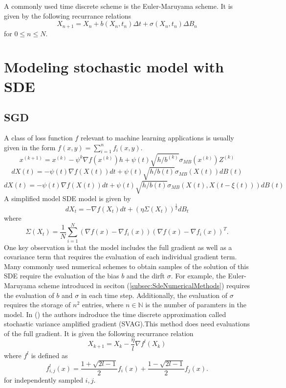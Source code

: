 \documentclass[12pt]{article}
\theoremstyle{definition}
\numberwithin{equation}{section}
\begin{document}
A commonly used time discrete scheme is the Euler-Maruyama scheme. It is given by the following recurrance relations
\begin{equation}
  X_{n+1} = X_n + b(X_n, t_n)\Delta t + \sigma(X_n, t_n) \Delta B_n
\end{equation}
for $0 \leq n \leq N$.
\section{Modeling stochastic model with SDE}

\subsection{SGD}
A class of loss function $f$ relevant to machine learning applications is usually given in the form $f(x,y) = \sum_{i=1}^n f_i(x,y)$.
\begin{equation}
  x^{(k+1)} = x^{(k)} - \psi^k \nabla f(x^{(k)}) h +  \psi(t)\sqrt{h/b^{(k)}} \sigma_{MB}(x^{(k)})Z^{(k)}
\end{equation}
\begin{equation}
  dX(t) = -\psi(t)\nabla f(X(t))dt + \psi(t)\sqrt{h/b(t)} \sigma_{MB}(X(t))dB(t)
\end{equation}
\begin{equation}
  dX(t) = -\psi(t)\nabla f(X(t))dt + \psi(t)\sqrt{h/b(t)} \sigma_{MB}(X(t), X(t-\xi(t)))dB(t)
\end{equation}
A simplified model SDE model is given by 
\begin{equation}
  dX_t = -\nabla f(X_t)dt + (\eta \Sigma(X_t))^{\frac{1}{2}}dB_t
\end{equation}
where
\begin{equation}
  \Sigma(X_t) = \frac{1}{N} \sum_{i=1}^N (\nabla f(x) - \nabla f_i(x))(\nabla f(x) - \nabla f_i(x))^T.
\end{equation}
One key observation is that the model includes the full gradient as well as a covariance term that requires the evaluation of each individual gradient term. Many commonly used numerical schemes  to obtain samples of the solution of this SDE require the evaluation of the bias $b$ and the dirft $\sigma$. For example, the Euler-Maruyama scheme introduced in seciton (\ref{subsec:SdeNumericalMethods}) requires the evaluation of $b$ and $\sigma$ in each time step. 
Additionally, the evaluation of $\sigma$ requires the storage of $n^2$ entries, where $n \in \mathbb{N}$ is the number of paramters in the model.
In (\cite*{li2021validity}) the authors indroduce the time discrete approximation called stochastic variance amplified gradient (SVAG).This method does need evaluations of the full gradient. It is given the following recurrance relation
\begin{equation}
  X_{k+1} = X_k - \frac{\eta}{l} \nabla f^l(X_k)
\end{equation}
where $f^l$ is defined as
\begin{equation}
  f^l_{i,j}(x) = \frac{1+\sqrt{2l - 1}}{2}f_i(x) + \frac{1-\sqrt{2l - 1}}{2}f_j(x).
\end{equation}
for independently sampled $i,j$.
\end{document}
